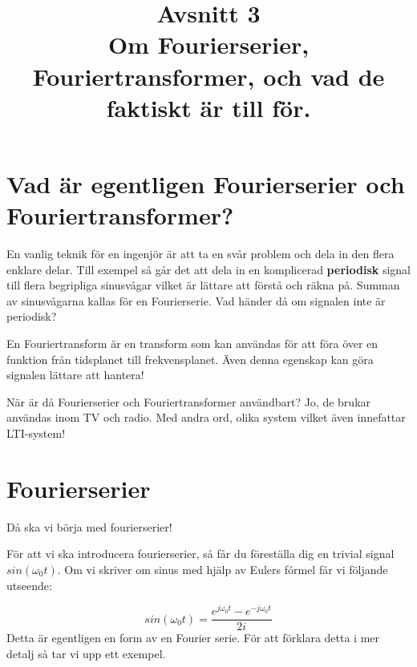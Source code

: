 \documentclass{article}
\title{Avsnitt 3 \\
\large Om Fourierserier, Fouriertransformer, och vad de faktiskt är till för.}
\author{ }
\date{}
\begin{document}
\maketitle

\section{Vad är egentligen Fourierserier och Fouriertransformer?}
En vanlig teknik för en ingenjör är att ta en svår problem och dela in den flera enklare delar. Till exempel så går det att dela in en komplicerad \textbf{periodisk} signal till flera begripliga sinusvågar vilket är lättare att förstå och räkna på. Summan av sinusvågarna kallas för en Fourierserie. Vad händer då om signalen inte är periodisk? 

En Fouriertransform är en transform som kan användas för att föra över en funktion från tidsplanet till frekvensplanet. Även denna egenskap kan göra signalen lättare att hantera! 

När är då Fourierserier och Fouriertransformer användbart? Jo, de brukar användas inom TV och radio. Med andra ord, olika system vilket även innefattar LTI-system!


\section{Fourierserier}

Då ska vi börja med fourierserier!

För att vi ska introducera fourierserier, så får du föreställa dig en trivial signal $sin(\omega_0 t)$. Om vi skriver om sinus med hjälp av Eulers fórmel får vi följande utseende:

\[sin(\omega_0 t) = \frac{e^{j \omega_0 t}  - e^{-j \omega_0 t}}{2i}\]
Detta är egentligen en form av en Fourier serie. För att förklara detta i mer detalj så tar vi upp ett exempel.
\end{document}
